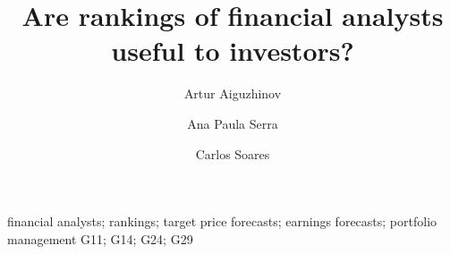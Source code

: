 \documentclass[authoryear,review]{elsarticle}
\begin{document}

\begin{frontmatter}
\title{Are rankings of financial analysts useful to investors?}


\author[fep,inesc]{Artur Aiguzhinov}

\author[fep]{Ana Paula Serra}

\author[inesc,feup]{Carlos Soares}



\address[fep]{Faculty of Economics (FEP) \& Center for Economics and Finance (CEF.UP), University of Porto, Portugal}
\address[inesc]{Institute for Systems and Computer Engineering, Technology and Science (INESC TEC), Portugal}
\address[feup]{Faculty of Engineering (FEUP), University of Porto, Portugal}


\begin{abstract}

\end{abstract}
\begin{keyword}
financial analysts; rankings; target price forecasts; earnings forecasts; portfolio management
\JEL G11; G14; G24; G29
\end{keyword}

\end{frontmatter}
\newpage
\end{document}
